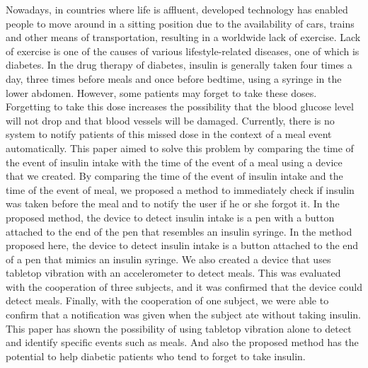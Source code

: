 \begin{eabstract}

  Nowadays, in countries where life is affluent, developed technology has enabled people to move around in a sitting position due to the availability of cars, trains and other means of transportation, resulting in a worldwide lack of exercise.
  Lack of exercise is one of the causes of various lifestyle-related diseases, one of which is diabetes. In the drug therapy of diabetes, insulin is generally taken four times a day, three times before meals and once before bedtime, using a syringe in the lower abdomen.
  However, some patients may forget to take these doses. Forgetting to take this dose increases the possibility that the blood glucose level will not drop and that blood vessels will be damaged.
  Currently, there is no system to notify patients of this missed dose in the context of a meal event automatically.
  This paper aimed to solve this problem by comparing the time of the event of insulin intake with the time of the event of a meal using a device that we created.
  By comparing the time of the event of insulin intake and the time of the event of meal, we proposed a method to immediately check if insulin was taken before the meal and to notify the user if he or she forgot it.
  In the proposed method, the device to detect insulin intake is a pen with a button attached to the end of the pen that resembles an insulin syringe.
  In the method proposed here, the device to detect insulin intake is a button attached to the end of a pen that mimics an insulin syringe. We also created a device that uses tabletop vibration with an accelerometer to detect meals.
  This was evaluated with the cooperation of three subjects, and it was confirmed that the device could detect meals. Finally, with the cooperation of one subject, we were able to confirm that a notification was given when the subject ate without taking insulin.
  This paper has shown the possibility of using tabletop vibration alone to detect and identify specific events such as meals.
  And also the proposed method has the potential to help diabetic patients who tend to forget to take insulin.

\end{eabstract}
